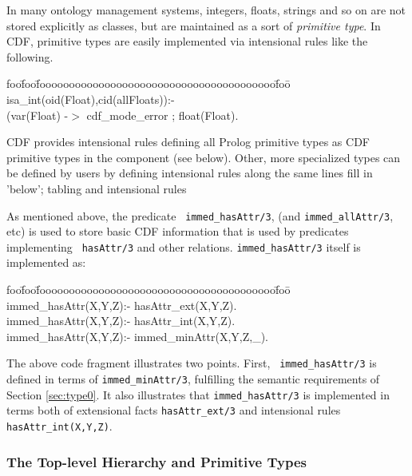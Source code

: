 \begin{example} \rm \label{ex:intrules}
In many ontology management systems, integers, floats, strings and so
on are not stored explicitly as classes, but are maintained as a sort
of {\em primitive type}.  In CDF, primitive types are easily
implemented via intensional rules like the following.
%
{\small {\sf  
\begin{tabbing}
foo\=foo\=foooooooooooooooooooooooooooooooooooooooo\=foo\=\kill
%
\> isa\_int(oid(Float),cid(allFloats)):- \\
\> \> 	(var(Float) -$>$ cdf\_mode\_error ; float(Float). \\
\end{tabbing} } }
\end{example}
%
CDF provides intensional rules defining all Prolog primitive types as
CDF primitive types in the component  (see below).
Other, more specialized types can be defined by users by defining
intensional rules along the same lines {\sc fill in 'below'; tabling
and intensional rules}

As mentioned above, the predicate {\tt
immed\_hasAttr/3}, (and {\tt immed\_allAttr/3}, etc) is used to store
basic CDF information that is used by predicates implementing {\tt
hasAttr/3} and other relations.  {\tt immed\_hasAttr/3} itself is
implemented as:
%
{\small {\sf  
\begin{tabbing}
foo\=foo\=foooooooooooooooooooooooooooooooooooooooo\=foo\=\kill
%
\> immed\_hasAttr(X,Y,Z):- hasAttr\_ext(X,Y,Z). \\
\> immed\_hasAttr(X,Y,Z):- hasAttr\_int(X,Y,Z). \\
\> immed\_hasAttr(X,Y,Z):- immed\_minAttr(X,Y,Z,\_). 
\end{tabbing} } }
%
\noindent
The above code fragment illustrates two points.  First, {\tt
immed\_hasAttr/3} is defined in terms of {\tt immed\_minAttr/3},
fulfilling the semantic requirements of Section \ref{sec:type0}.
It also illustrates that {\tt immed\_hasAttr/3} is implemented in
terms both of extensional facts {\tt hasAttr\_ext/3} and intensional
rules {\tt hasAttr\_int(X,Y,Z)}.  


\subsubsection{The Top-level Hierarchy and Primitive Types}

